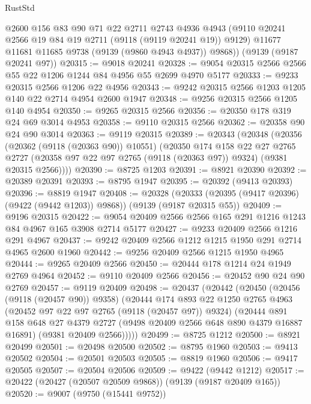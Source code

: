 \begin{lexlean}{RustStd}
\begin{coremodule}
        @2600
        @156
        @83
        @90
        @71
        @22
        @2711
        @2743
        @4936
        @4943
        (@9110 @20241 @2566 @19 @84 @19 @2711 (@9118 (@9119 @20241 @19)) @9129)
        @11677
        @11681
        @11685
        @9738
        (@9139 (@9860 @4943 @4937))
        @9868))
    (@9139 (@9187 @20241 @97))
@20315 := @9018 @20241
@20328 := @9054 @20315 @2566 @2566 @55 @22 @1206 @1244 @84 @4956 @55 @2699 @4970 @5177
@20333 := @9233 @20315 @2566 @1206 @22 @4956
@20343 := @9242 @20315 @2566 @1203 @1205 @140 @22 @2714 @4954 @2600 @1947
@20348 := @9256 @20315 @2566 @1205 @140 @4954
@20350 := @9265 @20315 @2566
@20356 := @20350 @178 @319 @24 @69 @3014 @4953
@20358 := @9110 @20315 @2566
@20362 := @20358 @90 @24 @90 @3014
@20363 := @9119 @20315
@20389 := @20343
    (@20348
      (@20356
        (@20362 (@9118 (@20363 @90)) @10551)
        (@20350
          @174
          @158
          @22
          @27
          @2765
          @2727
          (@20358 @97 @22 @97 @2765 (@9118 (@20363 @97)) @9324)
          (@9381 @20315 @2566))))
@20390 := @8725 @1203
@20391 := @8921 @20390
@20392 := @20389 @20391
@20393 := @8795 @1947
@20395 := @20392 (@9413 @20393)
@20396 := @8819 @1947
@20408 := @20328
    (@20333 (@20395 (@9417 @20396) (@9422 (@9442 @1203)) @9868))
    (@9139 (@9187 @20315 @55))
@20409 := @9196 @20315
@20422 := @9054 @20409 @2566 @2566 @165 @291 @1216 @1243 @84 @4967 @165 @3908 @2714 @5177
@20427 := @9233 @20409 @2566 @1216 @291 @4967
@20437 := @9242 @20409 @2566 @1212 @1215 @1950 @291 @2714 @4965 @2600 @1960
@20442 := @9256 @20409 @2566 @1215 @1950 @4965
@20444 := @9265 @20409 @2566
@20450 := @20444 @178 @1214 @24 @1949 @2769 @4964
@20452 := @9110 @20409 @2566
@20456 := @20452 @90 @24 @90 @2769
@20457 := @9119 @20409
@20498 := @20437
    (@20442
      (@20450
        (@20456 (@9118 (@20457 @90)) @9358)
        (@20444
          @174
          @893
          @22
          @1250
          @2765
          @4963
          (@20452 @97 @22 @97 @2765 (@9118 (@20457 @97)) @9324)
          (@20444
            @891
            @158
            @648
            @27
            @4379
            @2727
            (@9498 @20409 @2566 @648 @890 @4379 @16887 @16891)
            (@9381 @20409 @2566)))))
@20499 := @8725 @1212
@20500 := @8921 @20499
@20501 := @20498 @20500
@20502 := @8795 @1960
@20503 := @9413 @20502
@20504 := @20501 @20503
@20505 := @8819 @1960
@20506 := @9417 @20505
@20507 := @20504 @20506
@20509 := @9422 (@9442 @1212)
@20517 := @20422 (@20427 (@20507 @20509 @9868)) (@9139 (@9187 @20409 @165))
@20520 := @9007 (@9750 (@15441 @9752))

\end{coremodule}
\end{lexlean}
